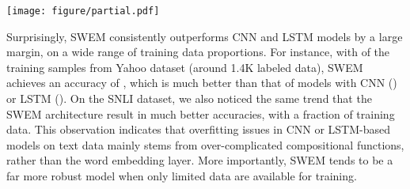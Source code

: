 \documentclass[11pt,a4paper]{article}
\begin{document}
\begin{figure*}
\centering
	\texttt{[image: figure/partial.pdf]}
	\label{fig:partial}
\end{figure*}

\begin{table}\centering
	\def\arraystretch{1.2}
	\caption{Test accuracy of SWEM on Yahoo dataset with a wide range of word embedding dimensions.}
	\label{tab:dim}
\end{table}

Surprisingly, SWEM consistently outperforms CNN and LSTM models by a large margin, on a wide range of training data proportions.
For instance, with  of the training samples from Yahoo dataset (around 1.4K labeled data), SWEM achieves an accuracy of , which is much better than that of models with CNN () or LSTM ().
On the SNLI dataset, we also noticed the same trend that the SWEM architecture result in much better accuracies, with a fraction of training data.
This observation indicates that overfitting issues in CNN or LSTM-based models on text data mainly stems from over-complicated compositional functions, rather than the word embedding layer.
More importantly, SWEM tends to be a far more robust model when only limited data are available for training.
\end{document}
